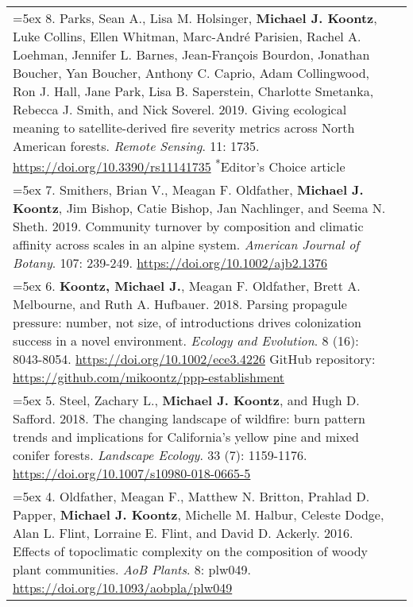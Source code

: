 \begin{longtable}{@{} >{\raggedright}p{6.10in} >{\raggedleft}X @{}}
\hangindent=5ex 8. Parks, Sean A., Lisa M. Holsinger, \textbf{Michael J. Koontz}, Luke Collins, Ellen Whitman, Marc-Andr\'e Parisien, Rachel A. Loehman, Jennifer L. Barnes, Jean-Fran\c{c}ois Bourdon, Jonathan Boucher, Yan Boucher, Anthony C. Caprio, Adam Collingwood, Ron J. Hall, Jane Park, Lisa B. Saperstein, Charlotte Smetanka, Rebecca J. Smith, and Nick Soverel. 2019. Giving ecological meaning to satellite-derived fire severity metrics across North American forests. \emph{Remote Sensing}. 11: 1735. \href{https://doi.org/10.3390/rs11141735}{https://doi.org/10.3390/rs11141735} \newline \textsuperscript{*}Editor's Choice article & \tabularnewline

\hangindent=5ex 7. Smithers, Brian V., Meagan F. Oldfather, \textbf{Michael J. Koontz}, Jim Bishop, Catie Bishop, Jan Nachlinger, and Seema N. Sheth. 2019. Community turnover by composition and climatic affinity across scales in an alpine system. \emph{American Journal of Botany}. 107: 239-249. \href{https://doi.org/10.1002/ajb2.1376}{https://doi.org/10.1002/ajb2.1376} & \tabularnewline

\hangindent=5ex 6. \textbf{Koontz, Michael J.}, Meagan F. Oldfather, Brett A. Melbourne, and Ruth A. Hufbauer. 2018. Parsing propagule pressure: number, not size, of introductions drives colonization success in a novel environment. \emph{Ecology and Evolution}. 8 (16): 8043-8054. \href{https://doi.org/10.1002/ece3.4226}{https://doi.org/10.1002/ece3.4226}
\newline GitHub repository: \href{https://github.com/mikoontz/ppp-establishment}{https://github.com/mikoontz/ppp-establishment} & \tabularnewline

\hangindent=5ex 5. Steel, Zachary L., \textbf{Michael J. Koontz}, and Hugh D. Safford. 2018. The changing landscape of wildfire: burn pattern trends and implications for California's yellow pine and mixed conifer forests. \emph{Landscape Ecology}. 33 (7): 1159-1176. \href{https://doi.org/10.1007/s10980-018-0665-5}{https://doi.org/10.1007/s10980-018-0665-5} &  \tabularnewline

\hangindent=5ex 4. Oldfather, Meagan F., Matthew N. Britton, Prahlad D. Papper, \textbf{Michael J. Koontz}, Michelle M. Halbur, Celeste Dodge, Alan L. Flint, Lorraine E. Flint, and David D. Ackerly. 2016. Effects of topoclimatic complexity on the composition of woody plant communities. \emph{AoB Plants}. 8: plw049. \href{https://doi.org/10.1093/aobpla/plw049}{https://doi.org/10.1093/aobpla/plw049} & \tabularnewline


\end{longtable}
